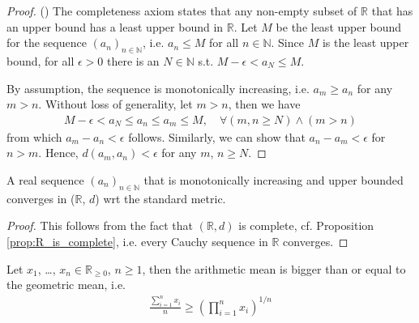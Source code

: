 \begin{proof}(\cite{2169936})
	The completeness axiom states that any non-empty subset of $\mathbb R$ that has an upper bound has a least upper bound in $\mathbb R$. Let $M$ be the least upper bound for the sequence $(a_n)_{n\in\mathbb N}$, i.e. $a_n \leq M$ for all $n\in\mathbb N$. Since $M$ is the least upper bound, for all $\epsilon > 0$ there is an $N\in\mathbb N$ s.t. $M - \epsilon < a_N \leq M$.
	
	By assumption, the sequence is monotonically increasing, i.e. $a_m \geq a_n$ for any $m > n$. Without loss of generality, let $m > n$, then we have
	\begin{align}\label{eq:mono_inc_seq_Cauchy}
		M - \epsilon < a_N \leq a_n \leq a_m \leq M, \quad \forall (m, n\geq N) \wedge (m > n)
	\end{align}
	from which $a_m - a_n < \epsilon$ follows. Similarly, we can show that $a_n - a_m < \epsilon$ for $n > m$. Hence, $d(a_m, a_n) < \epsilon$ for any $m$, $n\geq N$.
\end{proof}

\begin{corollary}\label{corollary:mono_inc_real_seq_convergence}
	A real sequence $(a_n)_{n\in\mathbb N}$ that is monotonically increasing and upper bounded converges in ($\mathbb R$, $d$) wrt the standard metric.
\end{corollary}

\begin{proof}
	This follows from the fact that $(\mathbb R, d)$ is complete, cf. Proposition \ref{prop:R_is_complete}, i.e. every Cauchy sequence in $\mathbb R$ converges.
\end{proof}

\begin{theorem}\label{thrm:AM-GM}
	Let $x_1$, \dots, $x_n\in\mathbb R_{\geq 0}$, $n\geq 1$, then the arithmetic mean is bigger than or equal to the geometric mean, i.e.
	\begin{align}\label{eq:AM-GM}
		\frac{\sum_{i=1}^{n} x_i}{n} \geq \left(\prod_{i=1}^{n}x_i\right)^{1/n}
	\end{align}
\end{theorem}

